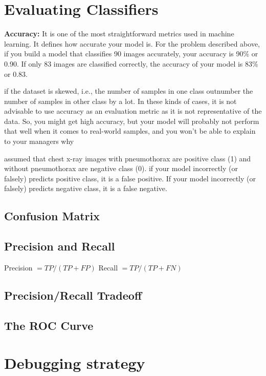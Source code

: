 \documentclass[openany]{book}
\begin{document}
\section{Evaluating Classifiers}

\textbf{Accuracy:} It is one of the most straightforward metrics used in machine learning. It defines how accurate your model is. For the problem described above, if you build a model that classifies 90 images accurately, your accuracy is 90\% or 0.90. If only 83 images are classified correctly, the accuracy of your model is 83\% or 0.83.

if the dataset is skewed, i.e., the number of samples in one class outnumber the number of samples in other class by a lot. In
these kinds of cases, it is not advisable to use accuracy as an evaluation metric as it is not representative of the data. So, you might get high accuracy, but your model will probably not perform that well when it comes to real-world samples, and you won’t be able to explain to your managers why

assumed that chest x-ray images with pneumothorax are positive class (1) and without pneumothorax are negative class (0). if your model incorrectly (or falsely) predicts positive class, it is a false positive. If your model incorrectly (or falsely) predicts negative class, it is a
false negative. 


\subsection{Confusion Matrix}
\subsection{Precision and Recall}


Precision $=T P /(T P+F P)$ 
Recall $=T P /(T P+F N)$

\subsection{Precision/Recall Tradeoff}

\subsection{The ROC Curve}



\section{Debugging strategy}
\end{document}
